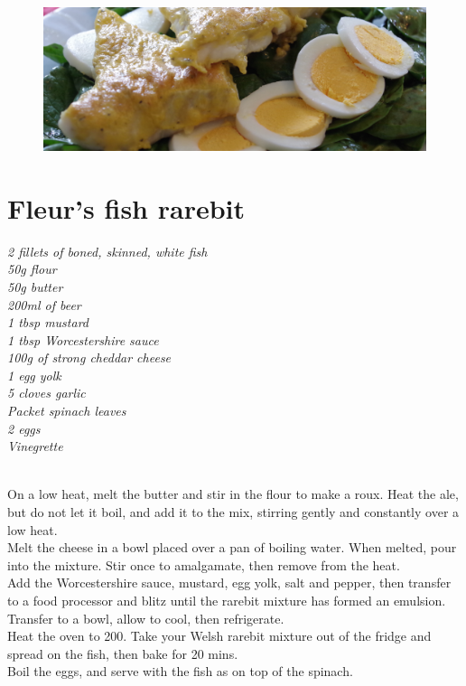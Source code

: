 \documentclass{tufte-book}
\begin{document}
\newpage


\begin{figure}[h]
  \includegraphics[width=\linewidth]{fleurs.JPG}%
\end{figure}

\section{Fleur's fish rarebit}

\emph{2 fillets of boned, skinned, white fish
\\50g flour
\\50g butter
\\200ml of beer
\\1 tbsp mustard
\\1 tbsp Worcestershire sauce
\\100g of strong cheddar cheese
\\1 egg yolk
\\5 cloves garlic
\\Packet spinach leaves
\\2 eggs
\\Vinegrette
}

\smallskip
{} 
\\On a low heat, melt the butter and stir in the flour to make a roux. Heat the ale, but do not let it boil, and add it to the mix, stirring gently and constantly over a low heat.
\\Melt the cheese in a bowl placed over a pan of boiling water. When melted, pour into the mixture. Stir once to amalgamate, then remove from the heat.
\\Add the Worcestershire sauce, mustard, egg yolk, salt and pepper, then transfer to a food processor and blitz until the rarebit mixture has formed an emulsion. Transfer to a bowl, allow to cool, then refrigerate.
\\ 
Heat the oven to 200\celsius. Take your Welsh rarebit mixture out of the fridge and spread on the fish, then bake for 20 mins.
\\Boil the eggs, and serve with the fish as on top of the spinach.
\end{document}
